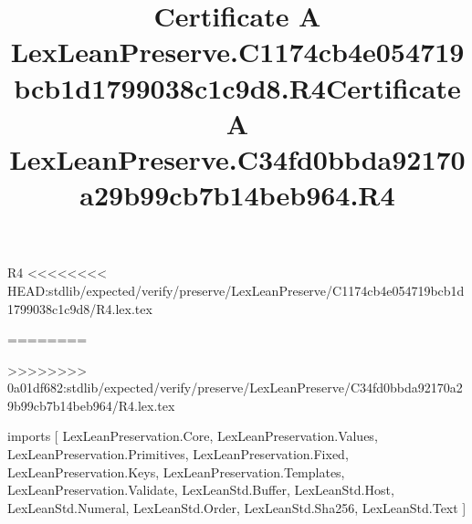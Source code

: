 \begin{lexlean}{R4}
<<<<<<<< HEAD:stdlib/expected/verify/preserve/LexLeanPreserve/C1174cb4e054719bcb1d1799038c1c9d8/R4.lex.tex
\title{Certificate A LexLeanPreserve.C1174cb4e054719bcb1d1799038c1c9d8.R4}
========
\title{Certificate A LexLeanPreserve.C34fd0bbda92170a29b99cb7b14beb964.R4}
>>>>>>>> 0a01df682:stdlib/expected/verify/preserve/LexLeanPreserve/C34fd0bbda92170a29b99cb7b14beb964/R4.lex.tex
\begin{coremodule}
imports [
  LexLeanPreservation.Core,
  LexLeanPreservation.Values,
  LexLeanPreservation.Primitives,
  LexLeanPreservation.Fixed,
  LexLeanPreservation.Keys,
  LexLeanPreservation.Templates,
  LexLeanPreservation.Validate,
  LexLeanStd.Buffer,
  LexLeanStd.Host,
  LexLeanStd.Numeral,
  LexLeanStd.Order,
  LexLeanStd.Sha256,
  LexLeanStd.Text
]


\end{coremodule}
\end{lexlean}
